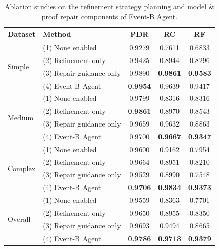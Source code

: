 \begin{table}[h!]
\footnotesize
\centering

\begin{minipage}[c]{0.58\columnwidth}

\begin{tabular}{llccc}

\toprule
Dataset & Method & PDR & RC & RF \\
\midrule
\multirow{4}{*}{Simple}
 & (1) None enabled & 0.9279 & 0.7611 & 0.6833 \\
 & (2) Refinement only & 0.9425 & 0.8944 & 0.8296 \\
 & (3) Repair guidance only & 0.9890 & \textbf{0.9861} & \textbf{0.9583} \\
 & (4) Event-B Agent & \textbf{0.9954} & 0.9639 & 0.9417 \\


\midrule
\multirow{4}{*}{Medium}
 & (1) None enabled & 0.9799 & 0.8316 & 0.8316 \\
 & (2) Refinement only & \textbf{0.9861} & 0.8970 & 0.8543 \\
 & (3) Repair guidance only & 0.9659 & 0.9632 & 0.8863 \\
 & (4) Event-B Agent & 0.9700 & \textbf{0.9667} & \textbf{0.9347} \\


\midrule
\multirow{4}{*}{Complex}
 & (1) None enabled & 0.9600 & 0.9162 & 0.7954 \\
 & (2) Refinement only & 0.9664 & 0.8951 & 0.8210 \\
 & (3) Repair guidance only & 0.9529 & 0.8990 & 0.7548 \\
 & (4) Event-B Agent & \textbf{0.9706} & \textbf{0.9834} & \textbf{0.9373} \\


\midrule
\multirow{4}{*}{Overall}
 & (1) None enabled & 0.9559 & 0.8363 & 0.7701 \\
 & (2) Refinement only & 0.9650 & 0.8955 & 0.8350 \\
 & (3) Repair guidance only & 0.9693 & 0.9494 & 0.8665 \\
 & (4) Event-B Agent & \textbf{0.9786} & \textbf{0.9713} & \textbf{0.9379} \\
\bottomrule

\end{tabular}
\caption{Ablation studies on the refinement strategy planning and model \& proof repair components of Event-B Agent.}
\label{tab:RQ2}

\end{minipage}
\hfill
\begin{minipage}[c]{0.37\columnwidth}


\end{minipage}
\end{table}
